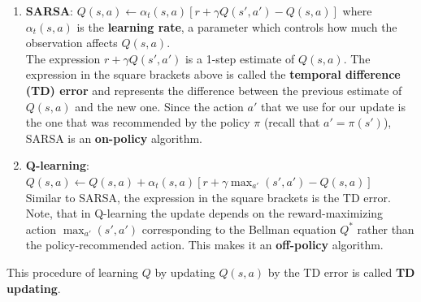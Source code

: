 \begin{enumerate}
    \item \textbf{SARSA}: $Q(s, a) \leftarrow \alpha_t(s, a)[r + \gamma Q(s', a') - Q(s, a)]$ where $\alpha_t(s, a)$ is the \textbf{learning rate}, a parameter which controls how much the observation affects $Q(s, a)$.\\
    The expression $r + \gamma Q(s', a')$ is a 1-step estimate of $Q(s, a)$. The expression in the square brackets above is called the \textbf{temporal difference (TD) error} and represents the difference between the previous estimate of $Q(s, a)$ and the new one. Since the action $a'$ that we use for our update is the one that was recommended by the policy $\pi$ (recall that $a' = \pi(s')$), SARSA is an \textbf{on-policy} algorithm.
    \item \textbf{Q-learning}: $Q(s, a) \leftarrow Q(s, a) + \alpha_t(s, a)[r + \gamma\max_{a'}(s', a') - Q(s, a)]$\\
    Similar to SARSA, the expression in the square brackets is the TD error. Note, that in Q-learning the update depends on the reward-maximizing action $\max_{a'}(s', a')$ corresponding to the Bellman equation $Q^*$ rather than the policy-recommended action. This makes it an \textbf{off-policy} algorithm.
\end{enumerate}
This procedure of learning $Q$ by updating $Q(s, a)$ by the TD error is called \textbf{TD updating}.
